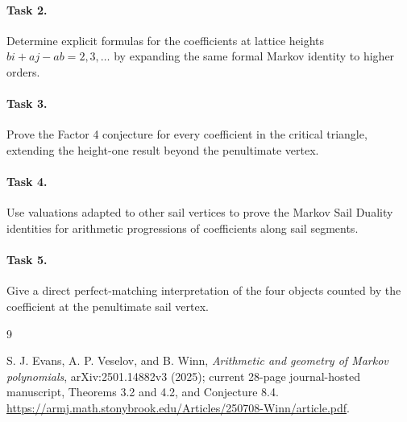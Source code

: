 \documentclass[11pt]{article}
\begin{document}
\paragraph{Task 2.}
Determine explicit formulas for the coefficients at lattice heights
$bi+aj-ab=2,3,\ldots$ by expanding the same formal Markov identity
to higher orders.

\paragraph{Task 3.}
Prove the Factor 4 conjecture for every coefficient in the critical
triangle, extending the height-one result beyond the penultimate
vertex.

\paragraph{Task 4.}
Use valuations adapted to other sail vertices to prove the
Markov Sail Duality identities for arithmetic progressions of
coefficients along sail segments.

\paragraph{Task 5.}
Give a direct perfect-matching interpretation of the four objects
counted by the coefficient at the penultimate sail vertex.

\begin{thebibliography}{9}
\raggedright
{}
S. J. Evans, A. P. Veselov, and B. Winn,
\emph{Arithmetic and geometry of Markov polynomials},
arXiv:2501.14882v3 (2025); current 28-page journal-hosted manuscript,
Theorems 3.2 and 4.2, and Conjecture 8.4.
\url{https://armj.math.stonybrook.edu/Articles/250708-Winn/article.pdf}.
\end{thebibliography}
\end{document}
